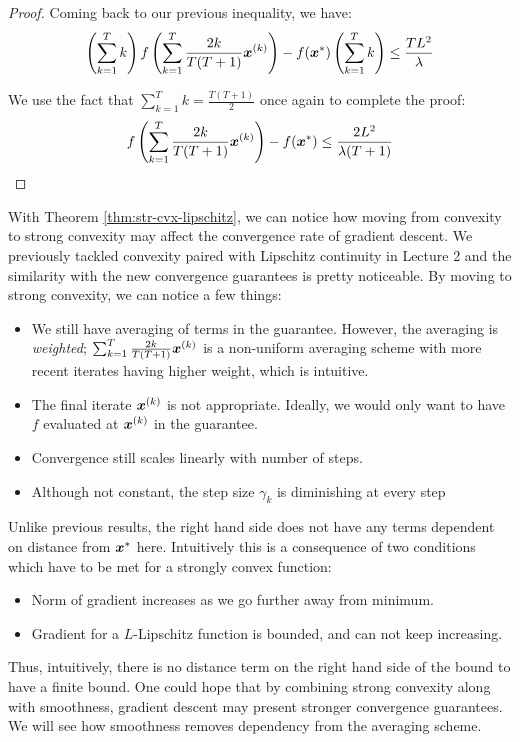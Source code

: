 \documentclass{article}
\begin{document}
{\begin{proof}
Coming back to our previous inequality, we have:
\[
    \left(\sum_{k=1}^{T} k\right) f\left(\sum_{k=1}^{T} \frac{2k}{T(T+1)} {\bm{x}}^{(k)}\right) - f({\bm{x}}^\ast) \left(\sum_{k=1}^{T} k\right) \leq \frac{T L^2}{\lambda}
\]

We use the fact that $\sum_{k=1}^{T} k = \frac{T(T+1)}{2}$ once again to complete the proof:
\[
    f\left(\sum_{k=1}^{T} \frac{2k}{T(T+1)} {\bm{x}}^{(k)}\right) - f({\bm{x}}^\ast) \le \frac{2 L^2}{\lambda (T+1)}
\]
\end{proof}

With Theorem \ref{thm:str-cvx-lipschitz}, we can notice how moving from convexity to strong convexity may affect the convergence rate of gradient descent. We previously tackled convexity paired with Lipschitz continuity in Lecture 2 and the similarity with the new convergence guarantees is pretty noticeable. By moving to strong convexity, we can notice a few things:
\begin{itemize}
    \item We still have averaging of terms in the guarantee. 
    However, the averaging is \emph{weighted}; $\sum_{k=1}^T \frac{2k}{T(T+1)} {\bm{x}}^{(k)}$ is a non-uniform averaging scheme with more recent iterates having higher weight, which is intuitive.
    \item The final iterate ${\bm{x}}^{(k)}$ is not appropriate.
    Ideally, we would only want to have $f$ evaluated at ${\bm{x}}^{(k)}$ in the guarantee.
    \item Convergence still scales linearly with number of steps.
    \item Although not constant, the step size $\gamma_k$ is diminishing at every step
\end{itemize}

Unlike previous results, the right hand side does not have any terms dependent on distance from ${\bm{x}}^\ast$ here. Intuitively this is a consequence of two conditions which have to be met for a strongly convex function:
\begin{itemize}
    \item Norm of gradient increases as we go further away from minimum.
    \item Gradient for a $L$-Lipschitz function is bounded, and can not keep increasing.
\end{itemize}
Thus, intuitively, there is no distance term on the right hand side of the bound to have a finite bound.
One could hope that by combining strong convexity along with smoothness, gradient descent may present stronger convergence guarantees. 
We will see how smoothness removes dependency from the averaging scheme.


}
\end{document}
